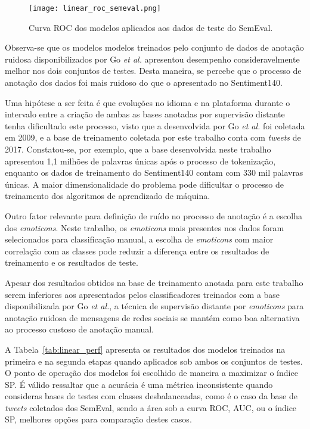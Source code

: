 \begin{figure}
\begin{center} {
    \begin{center}
    \texttt{[image: linear\_roc\_semeval.png]}
    \caption{Curva ROC dos modelos aplicados aos dados de teste do SemEval.}
    \label{fig:linear_roc_semeval}
    \end{center}
}
\end{center}
\end{figure}

Observa-se que os modelos modelos treinados pelo conjunto de dados de anotação ruidosa disponibilizados por Go
\textit{et al.} apresentou desempenho consideravelmente melhor nos dois conjuntos de testes.
Desta maneira, se percebe que o processo de anotação dos dados foi mais ruidoso do que o apresentado no Sentiment140.

Uma hipótese a ser feita é que evoluções no idioma e na plataforma durante o intervalo entre a criação de ambas as
bases anotadas por supervisão distante tenha dificultado este processo, visto que a desenvolvida por Go \textit{et al.}
foi coletada em 2009, e a base de treinamento coletada por este trabalho conta com \textit{tweets} de 2017.
Constatou-se, por exemplo, que a base desenvolvida neste trabalho apresentou 1,1 milhões de palavras únicas após o
processo de tokenização, enquanto os dados de treinamento do Sentiment140 contam com 330 mil palavras únicas.
A maior dimensionalidade do problema pode dificultar o processo de treinamento dos algoritmos de aprendizado de máquina.

Outro fator relevante para definição de ruído no processo de anotação é a escolha dos \textit{emoticons}.
Neste trabalho, os \textit{emoticons} mais presentes nos dados foram selecionados para classificação manual, a escolha
de \textit{emoticons} com maior correlação com as classes pode reduzir a diferença entre os resultados de treinamento e
os resultados de teste.

Apesar dos resultados obtidos na base de treinamento anotada para este trabalho serem inferiores aos apresentados pelos
classificadores treinados com a base disponibilizada por Go \textit{et al.}, a técnica de supervisão distante por
\textit{emoticons} para anotação ruidosa de mensagens de redes sociais se mantém como boa alternativa ao processo
custoso de anotação manual.

A Tabela~\ref{tab:linear_perf} apresenta os resultados dos modelos treinados na primeira e na segunda etapas quando
aplicados sob ambos os conjuntos de testes.
O ponto de operação dos modelos foi escolhido de maneira a maximizar o índice SP.
É válido ressaltar que a acurácia é uma métrica inconsistente quando consideras bases de testes com classes
desbalanceadas, como é o caso da base de \textit{tweets} coletados dos SemEval, sendo a área sob a curva ROC, AUC, ou o
índice SP, melhores opções para comparação destes casos.

